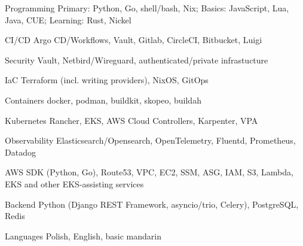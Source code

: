 

\begin{cvskills}

  \cvskill
  {Programming} %
  {Primary: Python, Go, shell/bash, Nix; Basics: JavaScript, Lua, Java, CUE; Learning: Rust, Nickel} %

  \cvskill
  {CI/CD} %
  {Argo CD/Workflows, Vault, Gitlab, CircleCI, Bitbucket, Luigi} %

  \cvskill
  {Security} %
  {Vault, Netbird/Wireguard, authenticated/private infrastucture} %

  \cvskill
  {IaC} %
  {Terraform (incl. writing providers), NixOS, GitOps} %

  \cvskill
  {Containers} %
  {docker, podman, buildkit, skopeo, buildah} %

  \cvskill
  {Kubernetes} %
  {Rancher, EKS, AWS Cloud Controllers, Karpenter, VPA} %

  \cvskill
  {Observability} %
  {Elasticsearch/Opensearch, OpenTelemetry, Fluentd, Prometheus, Datadog} %

  \cvskill
  {AWS} %
  {SDK (Python, Go), Route53, VPC, EC2, SSM, ASG, IAM, S3, Lambda, EKS  and other EKS-assisting services} %

  \cvskill
  {Backend} %
  {Python (Django REST Framework, asyncio/trio, Celery), PostgreSQL, Redis} %

  \cvskill
  {Languages} %
  {Polish, English, basic mandarin} %

\end{cvskills}
